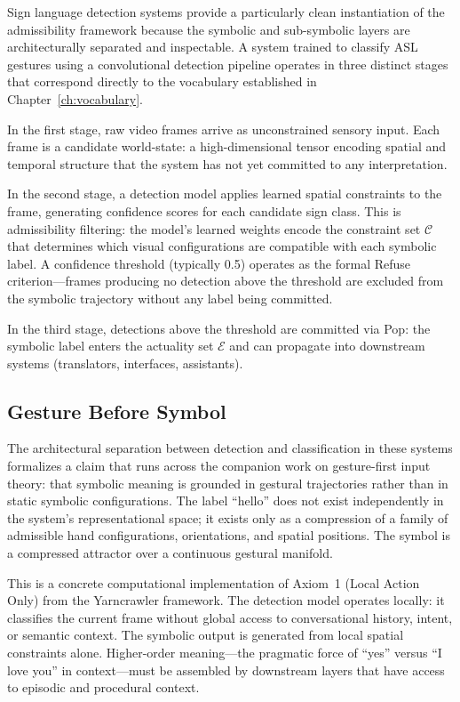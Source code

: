 \claimP Sign language detection systems provide a particularly clean instantiation
of the admissibility framework because the symbolic and sub-symbolic layers are
architecturally separated and inspectable. A system trained to classify ASL gestures
using a convolutional detection pipeline operates in three distinct stages that
correspond directly to the vocabulary established in Chapter~\ref{ch:vocabulary}.

In the first stage, raw video frames arrive as unconstrained sensory input. Each
frame is a candidate world-state: a high-dimensional tensor encoding spatial and
temporal structure that the system has not yet committed to any interpretation.

In the second stage, a detection model applies learned spatial constraints to the
frame, generating confidence scores for each candidate sign class. This is
admissibility filtering: the model's learned weights encode the constraint set
$\mathcal{C}$ that determines which visual configurations are compatible with each
symbolic label. A confidence threshold (typically 0.5) operates as the formal
Refuse criterion---frames producing no detection above the threshold are excluded
from the symbolic trajectory without any label being committed.

In the third stage, detections above the threshold are committed via Pop: the
symbolic label enters the actuality set $\mathcal{E}$ and can propagate into
downstream systems (translators, interfaces, assistants).

\subsection{Gesture Before Symbol}

The architectural separation between detection and classification in these systems
formalizes a claim that runs across the companion work on gesture-first input theory:
that symbolic meaning is grounded in gestural trajectories rather than in static
symbolic configurations. The label ``hello'' does not exist independently in the
system's representational space; it exists only as a compression of a family of
admissible hand configurations, orientations, and spatial positions. The symbol is
a compressed attractor over a continuous gestural manifold.

\claimH This is a concrete computational implementation of Axiom~1 (Local Action
Only) from the Yarncrawler framework. The detection model operates locally: it
classifies the current frame without global access to conversational history,
intent, or semantic context. The symbolic output is generated from local spatial
constraints alone. Higher-order meaning---the pragmatic force of ``yes'' versus
``I love you'' in context---must be assembled by downstream layers that have access
to episodic and procedural context.


